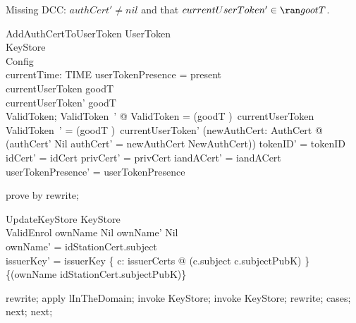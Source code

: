 Missing DCC: $authCert' \neq nil$ and that $currentUserToken' \in \ran gootT$.
\begin{schema}{AddAuthCertToUserToken}
  \Delta UserToken\\
  KeyStore\\
  Config\\
  currentTime: TIME
\where
  userTokenPresence = present\\
  currentUserToken \in  \ran  goodT\\
  currentUserToken' \in \ran goodT \\
  \exists  ValidToken; ValidToken~' @ \theta  ValidToken = (goodT \inv)~currentUserToken \land  \theta  ValidToken~' = (goodT \inv)~currentUserToken' \land
  			(\exists  newAuthCert: AuthCert @ (authCert' \neq Nil \land \The authCert' = newAuthCert \land  NewAuthCert)) \land  tokenID' = tokenID \land  idCert' = idCert \land  privCert' = privCert \land  iandACert' = iandACert\\
  userTokenPresence' = userTokenPresence
\end{schema}

\begin{zproof}
   prove by rewrite;
\end{zproof}

\begin{schema}{UpdateKeyStore}
  \Delta KeyStore\\
  ValidEnrol
\where
  ownName \neq Nil \land ownName' \neq Nil \\
  \The ownName' = idStationCert.subject\\
  issuerKey' = issuerKey \oplus  \{  c: issuerCerts @ (c.subject \mapsto  c.subjectPubK) \} \oplus  \{(\The ownName \mapsto  idStationCert.subjectPubK)\}
\end{schema}

\begin{zproof}
rewrite;
apply lInTheDomain;
invoke \Delta KeyStore;
invoke KeyStore;
rewrite;
cases;
next;
next;
\end{zproof}


